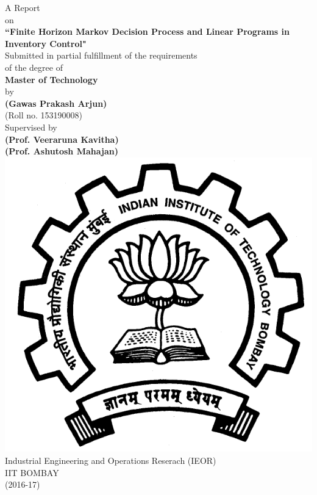 \begin{titlepage}
\begin{center}
	\vspace*{1cm}
	\Large
	A Report\\
	\vspace{0.5cm}
	\Large
	on\\
	\vspace{0.5cm}
	\Huge
	\textbf{``Finite Horizon Markov Decision Process and Linear Programs in Inventory Control"}\\
	\vspace{0.5cm}
	\vspace{1.5cm}
	\Large
	{Submitted in partial fulfillment of the requirements}\\
	\vspace{0.5cm}
	\Large
	of  the degree of\\
	\vspace{0.5cm}
	\Large
	\textbf{Master of Technology}\\
	\vspace{0.5cm}
	\Large
	by\\
	\vspace{0.2cm}
	\Large
	\textbf{(Gawas Prakash Arjun)}\\
	
	\Large
	(Roll no. 153190008)\\
	\vspace{0.5cm}
	\Large
	Supervised by\\
	\vspace{0.2cm}
	\Large
	\textbf{(Prof. Veeraruna Kavitha)}\\
	\textbf{(Prof. Ashutosh Mahajan)}\\
	\vspace{0.8cm}
	{\includegraphics[scale=0.1]{logo.jpg}}\\
	\Large
	Industrial Engineering and Operations Reserach (IEOR)\\
	\Large
	IIT BOMBAY\\
	\Large
		(2016-17)
\end{center}
\end{titlepage}